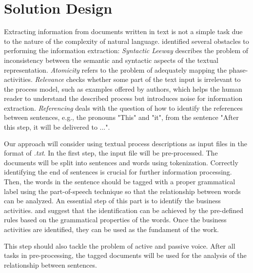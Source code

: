 \chapter{Solution Design}
\label{sec:solution}

Extracting information from documents written in text is not a simple task due to the nature of the complexity of natural language. \cite{t2m_1} identified several obstacles to performing the information extraction: \textit{Syntactic Leeway} describes the problem of inconsistency between the semantic and syntactic aspects of the textual representation. \textit{Atomicity} refers to the problem of adequately mapping the phase-activities. \textit{Relevance} checks whether some part of the text input is irrelevant to the process model, such as examples offered by authors, which helps the human reader to understand the described process but introduces noise for information extraction. \textit{Referencing} deals with the question of how to identify the references between sentences, e.g., the pronouns "This" and "it", from the sentence "After this step, it will be delivered to ...".

Our approach will consider using textual process descriptions as input files in the format of \textit{.txt}. In the first step, the input file will be pre-processed. The documents will be split into sentences and words using tokenization. Correctly identifying the end of sentences is crucial for further information processing. Then, the words in the sentence should be tagged with a proper grammatical label using the part-of-speech technique so that the relationship between words can be analyzed. An essential step of this part is to identify the business activities. \cite{t2m_5} and \cite{complement_1} suggest that the identification can be achieved by the pre-defined rules based on the grammatical properties of the words. Once the business activities are identified, they can be used as the fundament of the work.


This step should also tackle the problem of active and passive voice. After all tasks in pre-processing, the tagged documents will be used for the analysis of the relationship between sentences.

